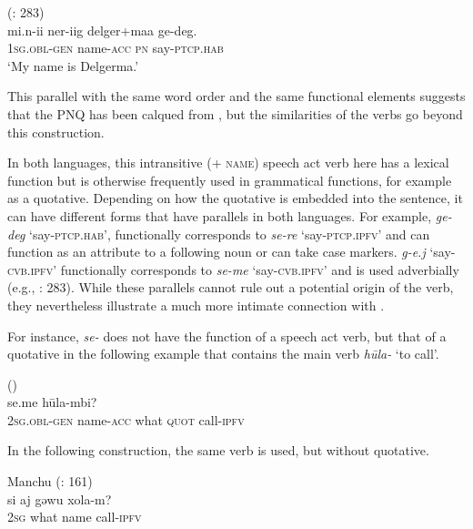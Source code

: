 \documentclass[output=paper,colorlinks,citecolor=brown]{langscibook}
\begin{document}
\ea
    \label{example4.119}
     (\citealt{Janhunen2012b}: 283)\\
    \gll mi.n-ii			ner-iig		delger+maa		ge-deg.\\
    1\textsc{sg.obl-gen}		name-\textsc{acc}		\textsc{pn}				say-\textsc{ptcp.hab}\\
    \glt ‘My name is Delgerma.’
    \z

\noindent This parallel with the same word order and the same functional elements suggests that the  PNQ has been calqued from , but the similarities of the verbs go beyond this construction.

In both languages, this intransitive (+ \textsc{name}) speech act verb here has a lexical function but is otherwise frequently used in grammatical functions, for example as a quotative. Depending on how the quotative is embedded into the sentence, it can have different forms that have parallels in both languages. For example,  \textit{ge-deg} ‘say-\textsc{ptcp.hab}’, functionally corresponds to  \textit{se-re} ‘say-\textsc{ptcp.ipfv}’ and can function as an attribute to a following noun or can take case markers.  \textit{g-e.j} ‘say-\textsc{cvb.ipfv}’ functionally corresponds to  \textit{se-me} ‘say-\textsc{cvb.ipfv}’ and is used adverbially (e.g., \citealt{Janhunen2012b}: 283). While these parallels cannot rule out a potential  origin of the  verb, they nevertheless illustrate a much more intimate connection with .

For instance, \textit{se-} does not have the function of a speech act verb, but that of a quotative in the following example that contains the main verb \textit{hūla-} ‘to call’.

\ea
    \label{example4.120}
     (\citealt{Schluessel2014})\\
    \gll [si.n-i	gebu-be		ai]		se.me	hūla-mbi?\\
    2\textsc{sg.obl-gen}		name-\textsc{acc}		what		\textsc{quot}	call-\textsc{ipfv}\\
    \z

\noindent In the following construction, the same verb is used, but without quotative.

\ea
    \label{example4.121}
     Manchu (\citealt{KimJuwon2008}: 161)\\
    \gll si		aj		gəwu	xola-m?\\
    2\textsc{sg}		what		name	call-\textsc{ipfv}\\
    \z
\end{document}

